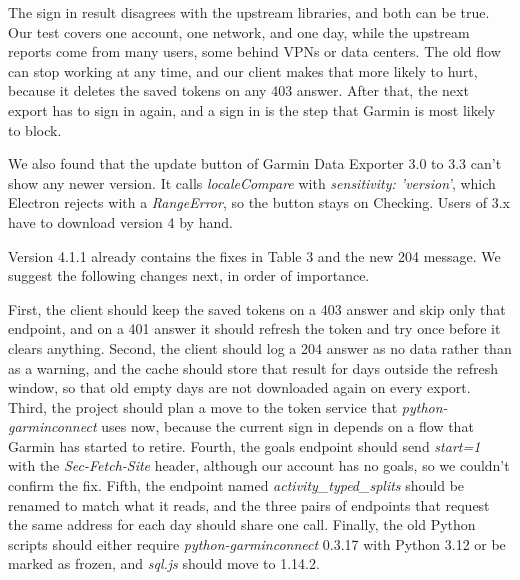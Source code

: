 \documentclass[11pt]{article}
\newcommand\code[1]{\textit{#1}}
\begin{document}
The sign in result disagrees with the upstream libraries, and both can be true. Our test covers one account, one network, and one day, while the upstream reports come from many users, some behind VPNs or data centers. The old flow can stop working at any time, and our client makes that more likely to hurt, because it deletes the saved tokens on any 403 answer. After that, the next export has to sign in again, and a sign in is the step that Garmin is most likely to block.

We also found that the update button of Garmin Data Exporter 3.0 to 3.3 can't show any newer version. It calls \code{localeCompare} with \code{sensitivity: 'version'}, which Electron rejects with a \code{RangeError}, so the button stays on Checking. Users of 3.x have to download version 4 by hand.

 Version 4.1.1 already contains the fixes in Table 3 and the new 204 message. We suggest the following changes next, in order of importance.

First, the client should keep the saved tokens on a 403 answer and skip only that endpoint, and on a 401 answer it should refresh the token and try once before it clears anything. Second, the client should log a 204 answer as no data rather than as a warning, and the cache should store that result for days outside the refresh window, so that old empty days are not downloaded again on every export. Third, the project should plan a move to the token service that \code{python-garminconnect} uses now, because the current sign in depends on a flow that Garmin has started to retire. Fourth, the goals endpoint should send \code{start=1} with the \code{Sec-Fetch-Site} header, although our account has no goals, so we couldn't confirm the fix. Fifth, the endpoint named \code{activity\_typed\_splits} should be renamed to match what it reads, and the three pairs of endpoints that request the same address for each day should share one call. Finally, the old Python scripts should either require \code{python-garminconnect} 0.3.17 with Python 3.12 or be marked as frozen, and \code{sql.js} should move to 1.14.2.

\end{document}
